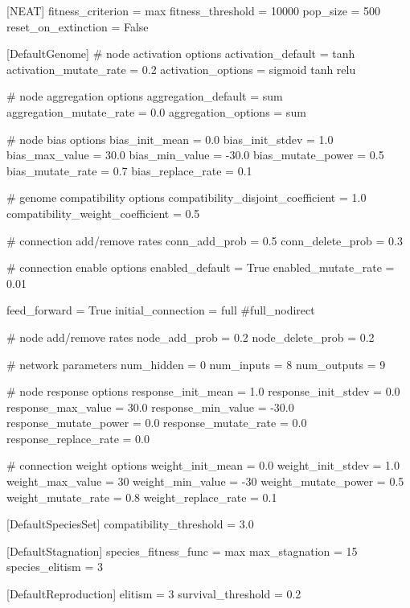 [NEAT]
fitness_criterion     = max
fitness_threshold     = 10000
pop_size              = 500
reset_on_extinction   = False

[DefaultGenome]
# node activation options
activation_default      = tanh
activation_mutate_rate  = 0.2
activation_options      = sigmoid tanh relu

# node aggregation options
aggregation_default     = sum
aggregation_mutate_rate = 0.0
aggregation_options     = sum

# node bias options
bias_init_mean          = 0.0
bias_init_stdev         = 1.0
bias_max_value          = 30.0
bias_min_value          = -30.0
bias_mutate_power       = 0.5
bias_mutate_rate        = 0.7
bias_replace_rate       = 0.1

# genome compatibility options
compatibility_disjoint_coefficient = 1.0
compatibility_weight_coefficient   = 0.5

# connection add/remove rates
conn_add_prob           = 0.5
conn_delete_prob        = 0.3

# connection enable options
enabled_default         = True
enabled_mutate_rate     = 0.01

feed_forward            = True
initial_connection      = full
#full_nodirect

# node add/remove rates
node_add_prob           = 0.2
node_delete_prob        = 0.2

# network parameters
num_hidden              = 0
num_inputs              = 8
num_outputs             = 9

# node response options
response_init_mean      = 1.0
response_init_stdev     = 0.0
response_max_value      = 30.0
response_min_value      = -30.0
response_mutate_power   = 0.0
response_mutate_rate    = 0.0
response_replace_rate   = 0.0

# connection weight options
weight_init_mean        = 0.0
weight_init_stdev       = 1.0
weight_max_value        = 30
weight_min_value        = -30
weight_mutate_power     = 0.5
weight_mutate_rate      = 0.8
weight_replace_rate     = 0.1

[DefaultSpeciesSet]
compatibility_threshold = 3.0

[DefaultStagnation]
species_fitness_func = max
max_stagnation       = 15
species_elitism      = 3

[DefaultReproduction]
elitism            = 3
survival_threshold = 0.2
